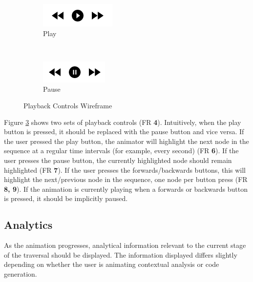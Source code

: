 \documentclass{l4proj}
\begin{document}
\begin{figure}[h]
	\begin{subfigure}[b]{0.45\textwidth}
		\includegraphics[]{images/playback-play-wireframe.png}
		\caption{Play}
		\label{fig:playback-play-wireframe}
	\end{subfigure}
	~
	\begin{subfigure}[b]{0.45\textwidth}
		\includegraphics[]{images/playback-pause-wireframe.png}
		\caption{Pause}
		\label{fig:playback-pause-wireframe}
	\end{subfigure}
	\caption{Playback Controls Wireframe}\label{fig:playback-wireframe}	
\end{figure}

Figure \ref{fig:playback-wireframe} shows two sets of playback controls (FR \textbf{4}). Intuitively, when the play button is pressed, it should be replaced with the pause button and vice versa. If the user pressed the play button, the animator will highlight the next node in the sequence at a regular time intervals (for example, every second) (FR \textbf{6}). If the user presses the pause button, the currently highlighted node should remain highlighted (FR \textbf{7}). If the user presses the forwards/backwards buttons, this will highlight the next/previous node in the sequence, one node per button press (FR \textbf{8, 9}). If the animation is currently playing when a forwards or backwards button is pressed, it should be implicitly paused.

\subsection{Analytics}
As the animation progresses, analytical information relevant to the current stage of the traversal should be displayed. The information displayed differs slightly depending on whether the user is animating contextual analysis or code generation.  
\end{document}
